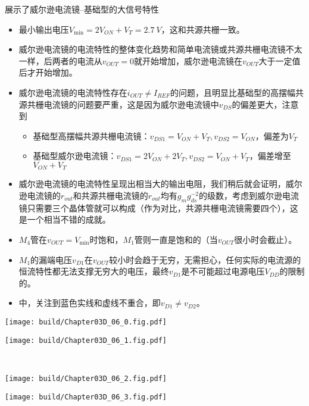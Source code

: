展示了威尔逊电流镜--基础型的大信号特性
\begin{itemize}
    \item 最小输出电压$V_{\min}=2V_{ON}+V_T=\SI{2.7}{V}$，这和共源共栅一致。
    \item 威尔逊电流镜的电流特性的整体变化趋势和简单电流镜或共源共栅电流镜不太一样，后两者的电流从$v_{OUT}=0$就开始增加，威尔逊电流镜在$v_{OUT}$大于一定值后才开始增加。
    \item 威尔逊电流镜的电流特性存在$i_{OUT}\neq I_{REF}$的问题，且明显比基础型的高摆幅共源共栅电流镜的问题要严重，这是因为威尔逊电流镜中$v_{DS}$的偏差更大，注意到
    \begin{itemize}
        \item 基础型高摆幅共源共栅电流镜：$v_{DS1}=V_{ON}+V_T, v_{DS2}=V_{ON}$，偏差为$V_T$
        \item 基础型威尔逊电流镜：$v_{DS1}=2V_{ON}+2V_T, v_{DS2}=V_{ON}+V_T$，偏差增至$V_{ON}+V_T$ 
    \end{itemize}
    \item 威尔逊电流镜的电流特性呈现出相当大的输出电阻，我们稍后就会证明，威尔逊电流镜的$r_{out}$和共源共栅电流镜的$r_{out}$均有$g_mg_{ds}^{-2}$的级数，考虑到威尔逊电流镜只需要三个晶体管就可以构成（作为对比，共源共栅电流镜需要四个），这是一个相当不错的成就。
    \item $M_4$管在$v_{OUT}=V_{\min}$时饱和，$M_1$管则一直是饱和的（当$v_{OUT}$很小时会截止）。
    \item $M_1$的漏端电压$v_{D1}$在$v_{OUT}$较小时会趋于无穷，无需担心，任何实际的电流源的恒流特性都无法支撑无穷大的电压，最终$v_{D1}$是不可能超过电源电压$V_{DD}$的限制的。
    \item {}中，关注到蓝色实线和虚线不重合，即$v_{D1}\neq v_{D2}$。
\end{itemize}

\begin{Figure}
    \begin{FigureSub}
        \texttt{[image: build/Chapter03D\_06\_0.fig.pdf]}
    \end{FigureSub}
    \begin{FigureSub}
        \texttt{[image: build/Chapter03D\_06\_1.fig.pdf]}
    \end{FigureSub}\\ \vspace{0.25cm}
    \begin{FigureSub}
        \texttt{[image: build/Chapter03D\_06\_2.fig.pdf]}
    \end{FigureSub}
    \begin{FigureSub}
        \texttt{[image: build/Chapter03D\_06\_3.fig.pdf]}
    \end{FigureSub}
\end{Figure}

